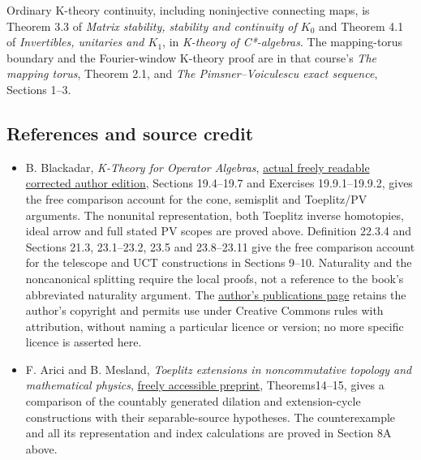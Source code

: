 \documentclass[
  11pt,
]{article}
\begin{document}
Ordinary K-theory continuity, including noninjective connecting maps, is
Theorem 3.3 of \emph{Matrix stability, stability and continuity of
\(K_0\)} and Theorem 4.1 of \emph{Invertibles, unitaries and \(K_1\)},
in \emph{K-theory of C*-algebras}. The mapping-torus boundary and the
Fourier-window K-theory proof are in that course's \emph{The mapping
torus}, Theorem 2.1, and \emph{The Pimsner--Voiculescu exact sequence},
Sections 1--3.

\subsection{References and source
credit}\label{references-and-source-credit}

\begin{itemize}
\item
  B. Blackadar, \emph{K-Theory for Operator Algebras},
  \href{https://www.bruceblackadar.com/Mathematics/book6.pdf}{actual
  freely readable corrected author edition}, Sections 19.4--19.7 and
  Exercises 19.9.1--19.9.2, gives the free comparison account for the
  cone, semisplit and Toeplitz/PV arguments. The nonunital
  representation, both Toeplitz inverse homotopies, ideal arrow and full
  stated PV scopes are proved above. Definition 22.3.4 and Sections
  21.3, 23.1--23.2, 23.5 and 23.8--23.11 give the free comparison
  account for the telescope and UCT constructions in Sections 9--10.
  Naturality and the noncanonical splitting require the local proofs,
  not a reference to the book's abbreviated naturality argument. The
  \href{https://www.bruceblackadar.com/mathpubs.html}{author's
  publications page} retains the author's copyright and permits use
  under Creative Commons rules with attribution, without naming a
  particular licence or version; no more specific licence is asserted
  here.
\item
  F. Arici and B. Mesland, \emph{Toeplitz extensions in noncommutative
  topology and mathematical physics},
  \href{https://arxiv.org/abs/1911.05823}{freely accessible preprint},
  Theorems14--15, gives a comparison of the countably generated dilation
  and extension-cycle constructions with their separable-source
  hypotheses. The counterexample and all its representation and index
  calculations are proved in Section 8A above.
\end{itemize}
\end{document}
